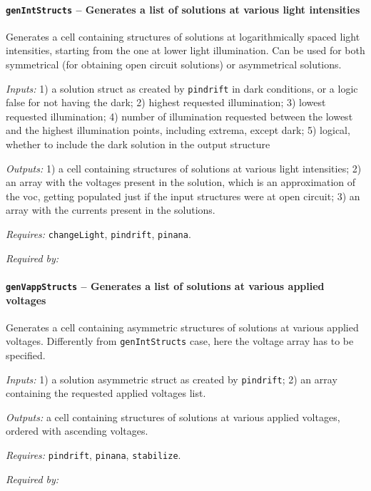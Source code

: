 		\paragraph{\texttt{genIntStructs} -- Generates a list of solutions at various light intensities}
Generates a cell containing structures of solutions at logarithmically spaced light intensities, starting from the one at lower light illumination. Can be used for both symmetrical (for obtaining open circuit solutions) or asymmetrical solutions.

		\textit{Inputs:} 1) a solution struct as created by \texttt{pindrift} in dark conditions, or a logic false for not having the dark; 
		2) highest requested illumination;
		3) lowest requested illumination;
		4) number of illumination requested between the lowest and the highest illumination points, including extrema, except dark;
		5) logical, whether to include the dark solution in the output     structure
		
\textit{Outputs:} 1) a cell containing structures of solutions at various light
     intensities;
2) an array with the voltages present in the solution, which is
     an approximation of the \gls{voc}, getting populated just if the input
     structures were at open circuit;
 3) an array with the currents present in the solutions.
 
\textit{Requires:} \texttt{changeLight}, \texttt{pindrift}, \texttt{pinana}.

\textit{Required by:} 

		\paragraph{\texttt{genVappStructs} -- Generates a list of solutions at various applied voltages}
Generates a cell containing asymmetric structures of solutions at various applied voltages.
Differently from \texttt{genIntStructs} case, here the voltage array has to be specified.

\textit{Inputs:} 1) a solution asymmetric struct as created by \texttt{pindrift};
2) an array containing the requested applied voltages list.

\textit{Outputs:} a cell containing structures of solutions at various applied
     voltages, ordered with ascending voltages.
     
\textit{Requires:} \texttt{pindrift}, \texttt{pinana}, \texttt{stabilize}.

\textit{Required by:} 

